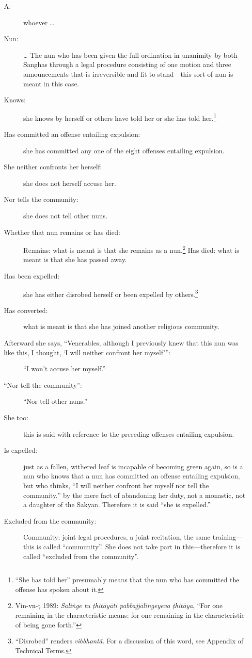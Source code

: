 \documentclass[12pt,openany]{book}%
\begin{document}
\begin{description}%
\item[A: ] whoever … %
\item[Nun: ] … The nun who has been given the full ordination in unanimity by both Sanghas through a legal procedure consisting of one motion and three announcements that is irreversible and fit to stand—this sort of nun is meant in this case. %
\item[Knows: ] she knows by herself or others have told her or she has told her.\footnote{“She has told her” presumably means that the nun who has committed the offense has spoken about it. } %
\item[Has committed an offense entailing expulsion: ] she has committed any one of the eight offenses entailing expulsion. %
\item[She neither confronts her herself: ] she does not herself accuse her. %
\item[Nor tells the community: ] she does not tell other nuns. %
\item[Whether that nun remains or has died: ] Remains: what is meant is that she remains as a nun.\footnote{Vin-vn-\textsanskrit{ṭ} 1989: \textit{\textsanskrit{Saliṅge} tu \textsanskrit{ṭhitāyāti} \textsanskrit{pabbajjāliṅgeyeva} \textsanskrit{ṭhitāya}}, “For one remaining in the characteristic means: for one remaining in the characteristic of being gone forth.” } Has died: what is meant is that she has passed away. %
\item[Has been expelled: ] she has either disrobed herself or been expelled by others.\footnote{“Disrobed” renders \textit{\textsanskrit{vibbhantā}}. For a discussion of this word, see Appendix of Technical Terms. } %
\item[Has converted: ] what is meant is that she has joined another religious community. %
\item[Afterward she says, “Venerables, although I previously knew that this nun was like this, I thought, ‘I will neither confront her myself’”: ] “I won’t accuse her myself.” %
\item[“Nor tell the community”: ] “Nor tell other nuns.” %
\item[She too: ] this is said with reference to the preceding offenses entailing expulsion. %
\item[Is expelled: ] just as a fallen, withered leaf is incapable of becoming green again, so is a nun who knows that a nun has committed an offense entailing expulsion, but who thinks, “I will neither confront her myself nor tell the community,” by the mere fact of abandoning her duty, not a monastic, not a daughter of the Sakyan. Therefore it is said “she is expelled.” %
\item[Excluded from the community: ] Community: joint legal procedures, a joint recitation, the same training—this is called “community”. She does not take part in this—therefore it is called “excluded from the community”. %
\end{description}
\end{document}
